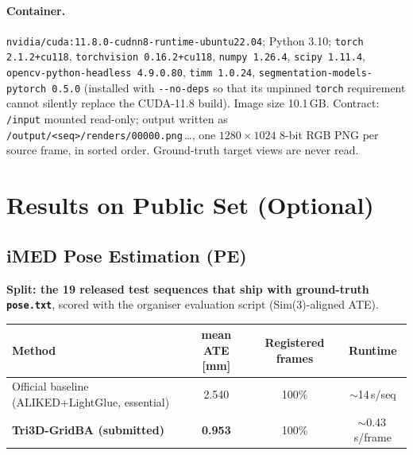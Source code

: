 \paragraph{Container.} \texttt{nvidia/cuda:11.8.0-cudnn8-runtime-ubuntu22.04}; Python 3.10;
\texttt{torch 2.1.2+cu118}, \texttt{torchvision 0.16.2+cu118}, \texttt{numpy 1.26.4},
\texttt{scipy 1.11.4}, \texttt{opencv-python-headless 4.9.0.80}, \texttt{timm 1.0.24},
\texttt{segmentation-models-pytorch 0.5.0} (installed with \texttt{-{}-no-deps} so that its unpinned
\texttt{torch} requirement cannot silently replace the CUDA-11.8 build). Image size 10.1\,GB. Contract:
\texttt{/input} mounted read-only; output written as
\texttt{/output/<seq>/renders/00000.png}\,\ldots, one $1280\times1024$ 8-bit RGB PNG per source frame, in
sorted order. Ground-truth target views are never read.

\section{Results on Public Set (Optional)}

%

\subsection{iMED Pose Estimation (PE)}

\textbf{Split: the 19 released test sequences that ship with ground-truth \texttt{pose.txt}}, scored with
the organiser evaluation script (Sim(3)-aligned ATE).

\begin{center}
\begin{tabular}{lccc}
\toprule
Method & mean ATE [mm] & Registered frames & Runtime \\
\midrule
Official baseline (ALIKED+LightGlue, essential) & 2.540 & 100\% & $\sim$14\,s/seq \\
\textbf{Tri3D-GridBA (submitted)}               & \textbf{0.953} & 100\% & $\sim$0.43\,s/frame \\
\bottomrule
\end{tabular}
\end{center}

